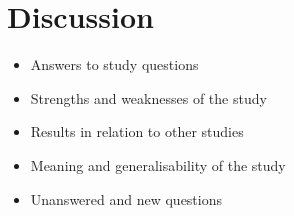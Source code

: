 \section*{Discussion}
\begin{itemize}
    \item Answers to study questions
    \item Strengths and weaknesses of the study
    \item Results in relation to other studies
    \item Meaning and generalisability of the study
    \item Unanswered and new questions
\end{itemize}